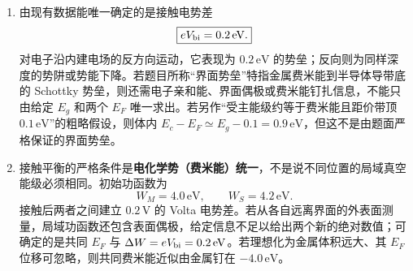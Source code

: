 \begin{question}[20 分]
\begin{solution}
\begin{enumerate}
\begin{center}
  \end{center}
  图的上、下弯方向会随所取空间方向和电势零点改变，必须以“$E_F$ 水平、总电势降为 $0.2\,\mathrm V$”为不变量。

  \item 由现有数据能唯一确定的是接触电势差
  \[
    \boxed{eV_{\rm bi}=0.2\,\mathrm{eV}.}
  \]
  对电子沿内建电场的反方向运动，它表现为 $0.2\,\mathrm{eV}$ 的势垒；反向则为同样深度的势阱或势能下降。若题目所称“界面势垒”特指金属费米能到半导体导带底的 Schottky 势垒，则还需电子亲和能、界面偶极或费米能钉扎信息，不能只由给定 $E_g$ 和两个 $E_F$ 唯一求出。若另作“受主能级约等于费米能且距价带顶 $0.1\,\mathrm{eV}$”的粗略假设，则体内
  $E_c-E_F\simeq E_g-0.1=0.9\,\mathrm{eV}$，但这不是由题面严格保证的界面势垒。

  \item 接触平衡的严格条件是\textbf{电化学势（费米能）统一}，不是说不同位置的局域真空能级必须相同。初始功函数为
  \[
    \boxed{W_M=4.0\,\mathrm{eV},\qquad W_S=4.2\,\mathrm{eV}.}
  \]
  接触后两者之间建立 $0.2\,\mathrm V$ 的 Volta 电势差。若从各自远离界面的外表面测量，局域功函数还包含表面偶极，给定信息不足以给出两个新的绝对数值；可确定的是共同 $E_F$ 与
  $\Delta W=eV_{\rm bi}=0.2\,\mathrm{eV}$。若理想化为金属体积远大、其 $E_F$ 位移可忽略，则共同费米能近似由金属钉在 $-4.0\,\mathrm{eV}$。
\end{enumerate}
\end{solution}
\end{question}
